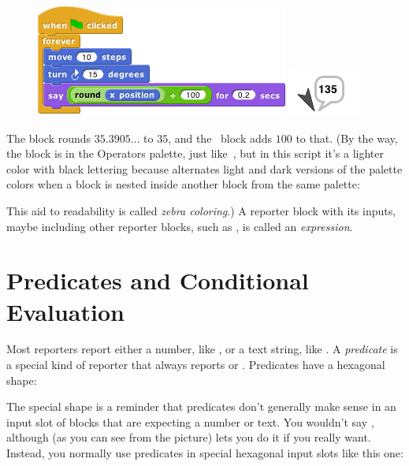 \documentclass{report}
\begin{document}
\begin{figure}[H]
\centering
\includegraphics[scale=\defaultGraphicsScale]{using-reporters-for-arithmetic}%
\hspace{2em}%
\includegraphics{../common/turtle-says-its-rounded-position}
\end{figure}

The  block rounds $35.3905\ldots$ to $35$, and the \code{+}~block adds $100$ to that. (By the way, the  block is in the Operators palette, just like~\code{+}, but in this script it's a lighter color with black lettering because \Snap{} alternates light and dark versions of the palette colors when a block is nested inside another block from the same palette:\nopagebreak


This aid to readability is called \emph{zebra coloring}.) A reporter block with its inputs, maybe including other reporter blocks, such as , is called an \emph{expression}.

\section{Predicates and Conditional Evaluation}

Most reporters report either a number, like , or a text string, like . A \emph{predicate} is a special kind of reporter that always reports  or . Predicates have a hexagonal shape:\nopagebreak


The special shape is a reminder that predicates don't generally make sense in an input slot of blocks that are expecting a number or text. You wouldn't say , although (as you can see from the picture) \Snap{} lets you do it if you really want. Instead, you normally use predicates in special hexagonal input slots like this one:\nopagebreak
\end{document}
